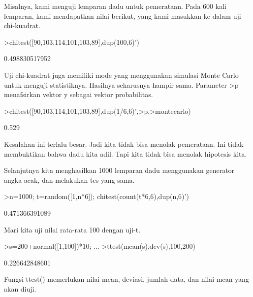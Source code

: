\documentclass[a4paper,10pt]{article}
\begin{document}
\begin{eulernotebook}
\begin{eulercomment}
\begin{eulercomment}
\begin{eulercomment}
Misalnya, kami menguji lemparan dadu untuk pemerataan. Pada 600 kali
lemparan, kami mendapatkan nilai berikut, yang kami masukkan ke dalam
uji chi-kuadrat.
\end{eulercomment}
\begin{eulerprompt}
>chitest([90,103,114,101,103,89],dup(100,6)')
\end{eulerprompt}
\begin{euleroutput}
  0.498830517952
\end{euleroutput}
\begin{eulercomment}
Uji chi-kuadrat juga memiliki mode yang menggunakan simulasi Monte
Carlo untuk menguji statistiknya. Hasilnya seharusnya hampir sama.
Parameter \textgreater{}p menafsirkan vektor y sebagai vektor probabilitas.
\end{eulercomment}
\begin{eulerprompt}
>chitest([90,103,114,101,103,89],dup(1/6,6)',>p,>montecarlo)
\end{eulerprompt}
\begin{euleroutput}
  0.529
\end{euleroutput}
\begin{eulercomment}
Kesalahan ini terlalu besar. Jadi kita tidak bisa menolak pemerataan.
Ini tidak membuktikan bahwa dadu kita adil. Tapi kita tidak bisa
menolak hipotesis kita.

Selanjutnya kita menghasilkan 1000 lemparan dadu menggunakan generator
angka acak, dan melakukan tes yang sama.
\end{eulercomment}
\begin{eulerprompt}
>n=1000; t=random([1,n*6]); chitest(count(t*6,6),dup(n,6)')
\end{eulerprompt}
\begin{euleroutput}
  0.471366391089
\end{euleroutput}
\begin{eulercomment}
Mari kita uji nilai rata-rata 100 dengan uji-t.
\end{eulercomment}
\begin{eulerprompt}
>s=200+normal([1,100])*10; ...
>ttest(mean(s),dev(s),100,200)
\end{eulerprompt}
\begin{euleroutput}
  0.226642848601
\end{euleroutput}
\begin{eulercomment}
Fungsi ttest() memerlukan nilai mean, deviasi, jumlah data, dan nilai
mean yang akan diuji.


\end{eulercomment}
\end{eulercomment}
\end{eulercomment}
\end{eulernotebook}
\end{document}
